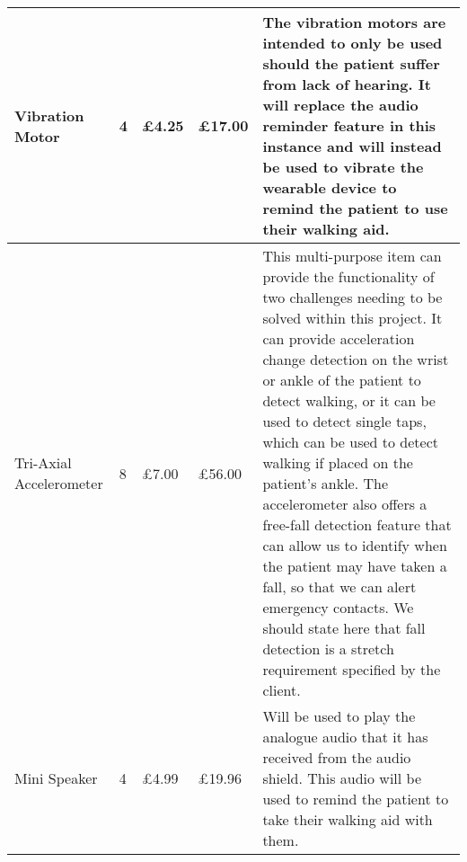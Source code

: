 \begin{xltabular}[H]{1.4\textwidth}{p{0.15\textwidth} | p{0.15\textwidth} | p{0.15\textwidth} |
		p{0.15\textwidth} |
		p{0.8\textwidth}}
			\midrule
			
			Vibration Motor

			&

			4

			&

			£4.25
			
			&
			
			£17.00
			
			&
			
			The vibration motors are intended to only be used should the patient suffer from lack of hearing. It will replace the audio reminder feature in this instance and will instead be used to vibrate the wearable device to remind the patient to use their walking aid.\\
			
			\midrule
			
			Tri-Axial Accelerometer

			&

			8

			&

			£7.00
			
			&
			
			£56.00
			
			&
			
			This multi-purpose item can provide the functionality of two challenges needing to be solved within this project. It can provide acceleration change detection on the wrist or ankle of the patient to detect walking, or it can be used to detect single taps, which can be used to detect walking if placed on the patient's ankle. The accelerometer also offers a free-fall detection feature that can allow us to identify when the patient may have taken a fall, so that we can alert emergency contacts. We should state here that fall detection is a stretch requirement specified by the client.\\
			
			\midrule
			
			Mini Speaker

			&

			4

			&

			£4.99
			
			&
			
			£19.96
			
			&
			
			Will be used to play the analogue audio that it has received from the audio shield. This audio will be used to remind the patient to take their walking aid with them.\\

		\end{xltabular} 
		\label{tbl:items}